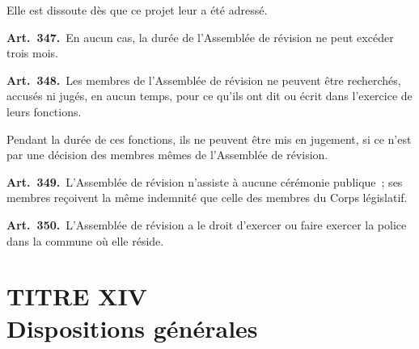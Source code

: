 \documentclass[french,twoside]{book} %
\newcommand{\labelchar}[1]{\textbf{\color{rubric} #1}}
\begin{document}
Elle est dissoute dès que ce projet leur a été adressé.\par
\labelchar{Art. 347.} En aucun cas, la durée de l’Assemblée de révision ne peut excéder trois mois.\par
\labelchar{Art. 348.} Les membres de l’Assemblée de révision ne peuvent être recherchés, accusés ni jugés, en aucun temps, pour ce qu’ils ont dit ou écrit dans l’exercice de leurs fonctions.\par
Pendant la durée de ces fonctions, ils ne peuvent être mis en jugement, si ce n’est par une décision des membres mêmes de l’Assemblée de révision.\par
\labelchar{Art. 349.} L’Assemblée de révision n’assiste à aucune cérémonie publique ; ses membres reçoivent la même indemnité que celle des membres du Corps législatif.\par
\labelchar{Art. 350.} L’Assemblée de révision a le droit d’exercer ou faire exercer la police dans la commune où elle réside.

\section[{TITRE XIV. Dispositions générales}]{TITRE XIV \\
Dispositions générales}
\end{document}
